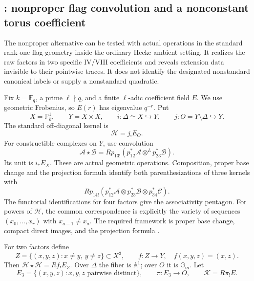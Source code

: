 \subsection{: nonproper flag convolution and a nonconstant torus coefficient}
\label{sec:nonpropertorus}

The nonproper alternative can be tested with actual operations in
the standard rank-one flag geometry inside the ordinary Hecke
ambient setting. It realizes the raw factors in two specific
IV/VIII coefficients and reveals extension data invisible to
their pointwise traces. It does not identify the designated
nonstandard canonical labels or supply a nonstandard quadratic.

Fix \(k=\mathbb F_q\), a prime \(\ell\nmid q\), and a finite
\(\ell\)-adic coefficient field \(E\).
We use geometric Frobenius, so \(E(r)\) has eigenvalue \(q^{-r}\).
Put
\[
 X=\mathbb P^1_k,\qquad Y=X\times X,\qquad
 i:\Delta\simeq X\hookrightarrow Y,\qquad
 j:O=Y\setminus\Delta\hookrightarrow Y.
\]
The standard off-diagonal kernel is
\[
                         \mathcal H=j_!E_O.
\]
For constructible complexes on \(Y\), use convolution
\begin{equation}\label{eq:flagkernelconvolution}
 \mathcal A\star\mathcal B
   =Rp_{13!}(p_{12}^*\mathcal A\otimes^L p_{23}^*\mathcal B).
\end{equation}
Its unit is \(i_*E_X\).
These are actual geometric operations. Composition, proper base
change and the projection formula identify both parenthesizations
of three kernels with
\[
 Rp_{14!}(p_{12}^*\mathcal A\otimes
          p_{23}^*\mathcal B\otimes p_{34}^*\mathcal C).
\]
The functorial identifications for four factors give the
associativity pentagon. For powers of \(\mathcal H\), the common
correspondence is explicitly the variety of sequences
\((x_0,\ldots,x_r)\) with \(x_{a-1}\ne x_a\).
The required framework is proper base change, compact direct
images, and the projection formula
\cite[Theorem~17.10, pp.~116--117; Proposition~18.4,
pp.~121--122; Proposition~22.5, pp.~136--137]{Milne}.

For two factors define
\[
 Z=\{(x,y,z):x\ne y,\ y\ne z\}\subset X^3,\qquad
 f:Z\to Y,\quad f(x,y,z)=(x,z).
\]
Then \(\mathcal H\star\mathcal H=Rf_!E_Z\).
Over \(\Delta\) the fiber is \(\mathbb A^1\); over \(O\)
it is \(\mathbb G_m\).
Let
\[
 E_3=\{(x,y,z):x,y,z\text{ pairwise distinct}\},\qquad
 \pi:E_3\to O,\qquad \mathcal K=R\pi_!E.
\]

